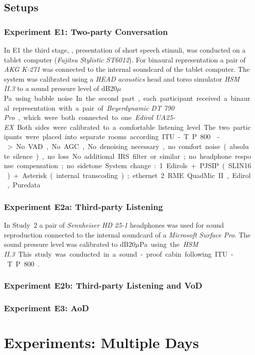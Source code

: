 \subsection{Setups}

\subsubsection{Experiment E1: Two-party Conversation}
In E1 the third stage, \ie, presentation of short speech stimuli, was conducted on a tablet computer (\emph{Fujitsu Stylistic ST6012}).
For binaural representation a pair of \emph{AKG K-271} was connected to the internal soundcard of the tablet computer.
The system was calibrated using a \emph{HEAD acoustics} head and torso simulator \emph{HSM II.3} to a sound pressure level of \unit[75]{dB20$\mu$Pa} using babble noise.
In the second part, each participant received a binaural representation with a pair of \emph{Beyerdynamic DT 790 Pro}, which were both connected to one \emph{Edirol UA25-EX}.
Both sides were calibrated to a comfortable listening level.
The two participants were placed into separate rooms according ITU-T P.800~\citep{itu-t_p.800:_1996}.

-> No VAD, No AGC, No denoising necessary, no comfort noise (absolute silence), no loss
No additional IRS filter or similar; no headphone response compensation; no sidetone.

System change: 
1. Edirols  + PJSIP (SLIN16) + Asterisk (internal transcoding); ethernet
2. RME QuadMic II, Edirol, Puredata  


\subsubsection{Experiment E2a: Third-party Listening}

In Study~2 a pair of \emph{Sennheiser HD 25-1} headphones was used for sound reproduction connected to the internal soundcard of a \emph{Microsoft Surface Pro}.
The sound pressure level was calibrated to \unit[75]{dB20$\mu$Pa} using the \emph{HSM II.3}.
This study was conducted in a sound-proof cabin following ITU-T P.800~\citep{itu-t_p.800:_1996}.

\subsubsection{Experiment E2b: Third-party Listening and \ac{VoD}}


\subsubsection{Experiment E3: \ac{AoD}}


\section{Experiments: Multiple Days}



